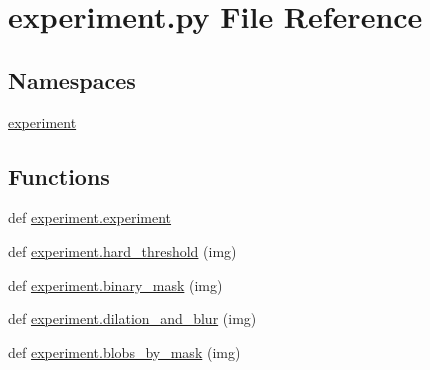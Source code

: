 \section{experiment.\+py File Reference}
\label{experiment_8py}
\subsection*{Namespaces}
\begin{DoxyCompactItemize}
\item 
 \hyperlink{namespaceexperiment}{experiment}
\end{DoxyCompactItemize}
\subsection*{Functions}
\begin{DoxyCompactItemize}
\item 
def \hyperlink{namespaceexperiment_afd7cadc0db62c738ec5313cac9cd03e5}{experiment.\+experiment}
\item 
def \hyperlink{namespaceexperiment_aeac24644877a02c335d201812ba51625}{experiment.\+hard\+\_\+threshold} (img)
\item 
def \hyperlink{namespaceexperiment_afbfd0da7a229ea75fe6eda26e04a344a}{experiment.\+binary\+\_\+mask} (img)
\item 
def \hyperlink{namespaceexperiment_aad51fba16bbd81e9a968249d747958b3}{experiment.\+dilation\+\_\+and\+\_\+blur} (img)
\item 
def \hyperlink{namespaceexperiment_a26994eacbd1a8bf004fc3477c8164daf}{experiment.\+blobs\+\_\+by\+\_\+mask} (img)
\end{DoxyCompactItemize}
